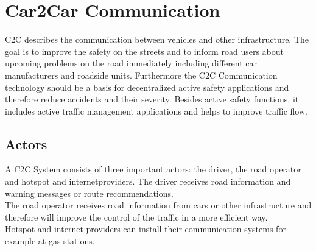 \chapter{Car2Car Communication}
\label{cha:Car2Car}
C2C describes the communication between vehicles and other infrastructure. The goal is to improve the safety on the streets and to inform road users about upcoming problems on the road immediately including different car manufacturers and roadside units. Furthermore the C2C Communication technology should be a basis for decentralized active safety applications and therefore reduce accidents and their severity. Besides active safety functions, it includes active traffic management applications and helps to improve traffic flow.

\section{Actors}
\label{sec:Actors}
A C2C System consists of three important actors: the driver, the road operator and hotspot and internetproviders.
The driver receives road information and warning messages or route recommendations.\\
The road operator receives road information from cars or other infrastructure and therefore will improve the control of the traffic in a more efficient way.\\
Hotspot and internet providers can install their communication systems for example at gas stations.

